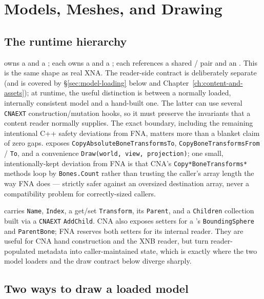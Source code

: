 \chapter{Models, Meshes, and Drawing}
\label{ch:models-meshes}

\section{The runtime hierarchy}

 owns a  and a ;
each  owns a  and a
; each  references a shared
 /  pair and an . This is the
same shape as real XNA. The reader-side contract is deliberately separate (and is covered by
\S\ref{sec:model-loading} below and Chapter~\ref{ch:content-and-assets}); at runtime, the useful
distinction is between a normally loaded, internally consistent model and a hand-built one.
The latter can use several \texttt{CNAEXT} construction/mutation hooks, so it must preserve the
invariants that a content reader normally supplies. The exact boundary, including the remaining
intentional C++ safety deviations from FNA, matters more than a blanket claim of zero gaps.
 exposes \texttt{CopyAbsoluteBoneTransformsTo},
\texttt{CopyBoneTransformsFrom} / \texttt{To}, and a convenience \texttt{Draw(world, view,
projection)}; one small, intentionally-kept deviation from FNA is that CNA's
\texttt{Copy*BoneTransforms*} methods loop by \texttt{Bones.Count} rather than trusting the
caller's array length the way FNA does --- strictly safer against an oversized destination
array, never a compatibility problem for correctly-sized callers.

 carries \texttt{Name}, \texttt{Index}, a get/set \texttt{Transform},
its \texttt{Parent}, and a \texttt{Children} collection built via a \texttt{CNAEXT}
\texttt{AddChild}. CNA also exposes setters for a 's
\texttt{BoundingSphere} and \texttt{ParentBone}; FNA reserves both setters for its internal
reader. They are useful for CNA hand construction and the XNB reader, but turn reader-populated
metadata into caller-maintained state, which is exactly where the two model loaders and the
draw contract below diverge sharply.

\section{Two ways to draw a loaded model}

